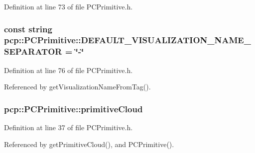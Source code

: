 Definition at line 73 of file P\-C\-Primitive.\-h.

\hypertarget{classpcp_1_1PCPrimitive_a9dc28983a955e1f9b1813a15e4260386}{
\subsubsection[{D\-E\-F\-A\-U\-L\-T\-\_\-\-V\-I\-S\-U\-A\-L\-I\-Z\-A\-T\-I\-O\-N\-\_\-\-N\-A\-M\-E\-\_\-\-S\-E\-P\-A\-R\-A\-T\-O\-R}]{\setlength{\rightskip}{0pt plus 5cm}const string pcp\-::\-P\-C\-Primitive\-::\-D\-E\-F\-A\-U\-L\-T\-\_\-\-V\-I\-S\-U\-A\-L\-I\-Z\-A\-T\-I\-O\-N\-\_\-\-N\-A\-M\-E\-\_\-\-S\-E\-P\-A\-R\-A\-T\-O\-R = \char`\"{}-\/\char`\"{}\hspace{0.3cm}{\ttfamily [static]}}}\label{classpcp_1_1PCPrimitive_a9dc28983a955e1f9b1813a15e4260386}


Definition at line 76 of file P\-C\-Primitive.\-h.



Referenced by get\-Visualization\-Name\-From\-Tag().

\hypertarget{classpcp_1_1PCPrimitive_accdf8a12234519275d4276b6706d4703}{
\subsubsection[{primitive\-Cloud}]{ pcp\-::\-P\-C\-Primitive\-::primitive\-Cloud\hspace{0.3cm}{\ttfamily [private]}}}\label{classpcp_1_1PCPrimitive_accdf8a12234519275d4276b6706d4703}


Definition at line 37 of file P\-C\-Primitive.\-h.



Referenced by get\-Primitive\-Cloud(), and P\-C\-Primitive().

